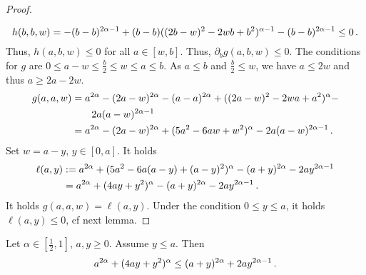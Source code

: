 \begin{proof}
\begin{align*}
	\end{align*}
	\begin{equation*}
		h(b,b,w) =-(b-b)^{2\alpha-1}+(b-b)((2b-w)^2 - 2 w b + b^2)^{\alpha-1} -  (b-b)^{2\alpha-1} \leq 0
		\, .
	\end{equation*}
	Thus, $h(a,b,w) \leq 0$ for all $a \in [w,b]$.
	Thus, $\partial_b g(a,b,w) \leq 0$.
	The conditions for $g$ are $0 \leq a-w \leq \frac b2 \leq w \leq a \leq b$.
	As $a \leq b$ and $\frac b2 \leq w$, we have $a \leq 2 w$ and thus $a \geq 2a-2w$.
	\begin{align*}
		g(a,a,w) 
		&= a^{2\alpha}-(2a-w)^{2\alpha}-(a-a)^{2\alpha}+((2a-w)^2 - 2 w a + a^2)^\alpha -
		\\&\qquad 2 a (a-w)^{2\alpha-1}
		\\&=
		a^{2\alpha}-(2a-w)^{2\alpha}+(5 a^2 - 6 a w + w^2)^\alpha - 2 a (a-w)^{2\alpha-1}
		\, .
	\end{align*}
	Set $w = a - y$, $y\in[0,a]$. It holds
	\begin{align*}
		\ell(a,y) &:= a^{2\alpha}+(5 a^2 - 6 a (a-y) + (a-y)^2)^\alpha - (a+y)^{2\alpha} - 2 a y^{2\alpha-1}
		\\&= 
		a^{2\alpha}+(4 a y + y^2)^\alpha - (a+y)^{2\alpha} - 2 a y^{2\alpha-1}
		\, .
	\end{align*}
	It holds $g(a,a,w) = \ell(a,y)$.
	Under the condition $0 \leq y \leq a$, it holds$\ell(a,y) \leq 0$, cf next lemma.
\end{proof}
%
\begin{lemma}
		Let $\alpha\in[\frac12, 1]$, $a,y\geq0$.
		Assume $y \leq a$.
		Then
		\begin{equation*}
			a^{2\alpha} + (4 a y + y^2)^\alpha 
			\leq
			(a+y)^{2\alpha} + 2 a y^{2\alpha-1}
			\, .
		\end{equation*}
\end{lemma}
%
